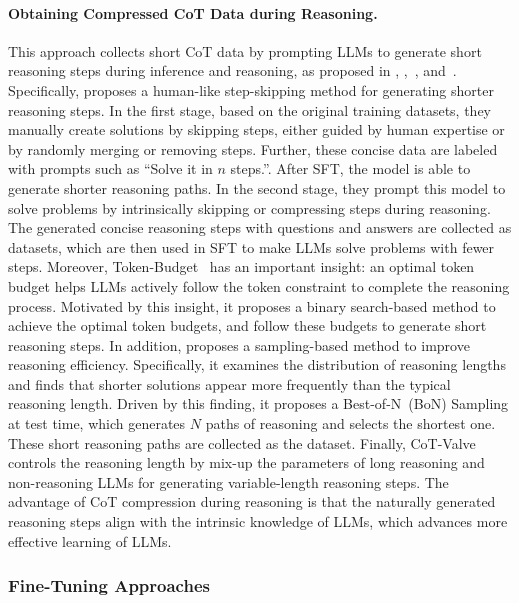 \paragraph{\textbf{Obtaining Compressed CoT Data during Reasoning.}}
This approach collects short CoT data by prompting LLMs to generate short reasoning steps during inference and reasoning, as proposed in \cite{liu2024can}, \cite{munkhbat2025self},~\cite{han2024token}, and~\cite{ma2025cot}.
Specifically, \cite{liu2024can} proposes a human-like step-skipping method for generating shorter reasoning steps. In the first stage, based on the original training datasets, they manually create solutions by skipping steps, either guided by human expertise or by randomly merging or removing steps. Further, these concise data are labeled with prompts such as “Solve it in $n$ steps.”. After SFT, the model is able to generate shorter reasoning paths. In the second stage, they prompt this model to solve problems by intrinsically skipping or compressing steps during reasoning.
The generated concise reasoning steps with questions and answers are collected as datasets, which are then used in SFT to make LLMs solve problems with fewer steps.
Moreover, Token-Budget~\cite{han2024token} has an important insight: an optimal token budget helps LLMs actively follow the token constraint to complete the reasoning process.
Motivated by this insight, it proposes a binary search-based method to achieve the optimal token budgets, and follow these budgets to generate short reasoning steps. 
In addition, \cite{munkhbat2025self} proposes a sampling-based method to improve reasoning efficiency.
Specifically, it examines the distribution of reasoning lengths and finds that shorter solutions appear more frequently than the typical reasoning length.
Driven by this finding, it proposes a Best-of-N~(BoN) Sampling at test time, which generates $N$ paths of reasoning and selects the shortest one.
These short reasoning paths are collected as the dataset.
Finally, CoT-Valve~\cite{ma2025cot} controls the reasoning length by mix-up the parameters of long reasoning and non-reasoning LLMs for generating variable-length reasoning steps.
The advantage of CoT compression during reasoning is that the naturally generated reasoning steps align with the intrinsic knowledge of LLMs, which advances more effective learning of LLMs.

\subsubsection{Fine-Tuning Approaches}

